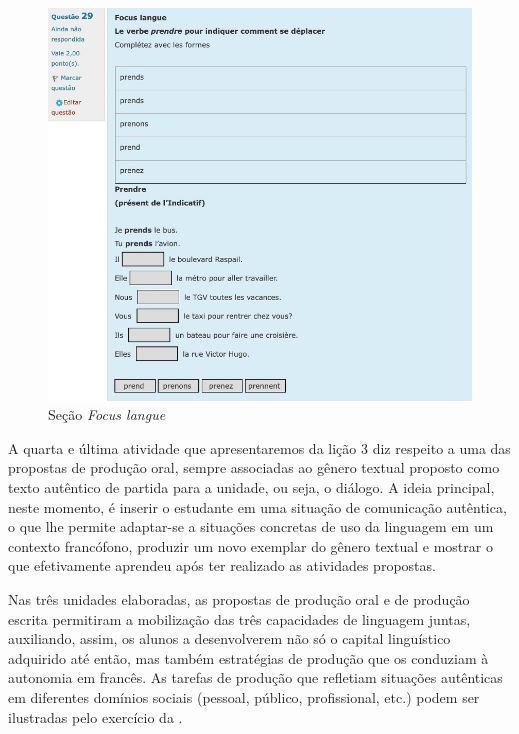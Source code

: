 \begin{figure}[htbp]
	\centering
	\begin{minipage}{0.8\textwidth}
		\includegraphics[width=\textwidth]{imagem3.png}
		\caption{Seção \emph{Focus langue}}
		\label{fig-3}
	\end{minipage}
\end{figure}


A quarta e última atividade que apresentaremos da lição 3 diz respeito a
uma das propostas de produção oral, sempre associadas ao gênero textual
proposto como texto autêntico de partida para a unidade, ou seja, o
diálogo. A ideia principal, neste momento, é inserir o estudante em uma
situação de comunicação autêntica, o que lhe permite adaptar-se a
situações concretas de uso da linguagem em um contexto francófono,
produzir um novo exemplar do gênero textual e mostrar o que efetivamente
aprendeu após ter realizado as atividades propostas.

Nas três unidades elaboradas, as propostas de produção oral e de
produção escrita permitiram a mobilização das três capacidades de
linguagem juntas, auxiliando, assim, os alunos a desenvolverem não só o
capital linguístico adquirido até então, mas também estratégias de
produção que os conduziam à autonomia em francês. As tarefas de produção
que refletiam situações autênticas em diferentes domínios sociais
(pessoal, público, profissional, etc.) podem ser ilustradas pelo
exercício da .

